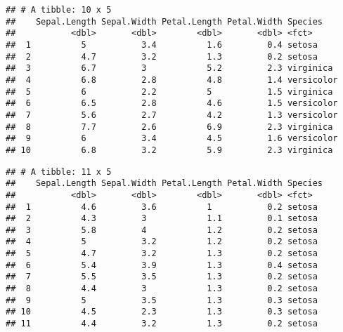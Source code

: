 \documentclass[]{book}
\newenvironment{Shaded}{\begin{snugshade}}{\end{snugshade}}
\newcommand{\DataTypeTok}[1]{\textcolor[rgb]{0.13,0.29,0.53}{#1}}
\newcommand{\DecValTok}[1]{\textcolor[rgb]{0.00,0.00,0.81}{#1}}
\newcommand{\KeywordTok}[1]{\textcolor[rgb]{0.13,0.29,0.53}{\textbf{#1}}}
\newcommand{\NormalTok}[1]{#1}
\newcommand{\OperatorTok}[1]{\textcolor[rgb]{0.81,0.36,0.00}{\textbf{#1}}}
\newcommand{\StringTok}[1]{\textcolor[rgb]{0.31,0.60,0.02}{#1}}
\begin{document}
\begin{Shaded}
\end{Shaded}

\begin{verbatim}
## # A tibble: 10 x 5
##    Sepal.Length Sepal.Width Petal.Length Petal.Width Species   
##           <dbl>       <dbl>        <dbl>       <dbl> <fct>     
##  1          5           3.4          1.6         0.4 setosa    
##  2          4.7         3.2          1.3         0.2 setosa    
##  3          6.7         3            5.2         2.3 virginica 
##  4          6.8         2.8          4.8         1.4 versicolor
##  5          6           2.2          5           1.5 virginica 
##  6          6.5         2.8          4.6         1.5 versicolor
##  7          5.6         2.7          4.2         1.3 versicolor
##  8          7.7         2.6          6.9         2.3 virginica 
##  9          6           3.4          4.5         1.6 versicolor
## 10          6.8         3.2          5.9         2.3 virginica
\end{verbatim}

\begin{Shaded}
\end{Shaded}

\begin{verbatim}
## # A tibble: 11 x 5
##    Sepal.Length Sepal.Width Petal.Length Petal.Width Species
##           <dbl>       <dbl>        <dbl>       <dbl> <fct>  
##  1          4.6         3.6          1           0.2 setosa 
##  2          4.3         3            1.1         0.1 setosa 
##  3          5.8         4            1.2         0.2 setosa 
##  4          5           3.2          1.2         0.2 setosa 
##  5          4.7         3.2          1.3         0.2 setosa 
##  6          5.4         3.9          1.3         0.4 setosa 
##  7          5.5         3.5          1.3         0.2 setosa 
##  8          4.4         3            1.3         0.2 setosa 
##  9          5           3.5          1.3         0.3 setosa 
## 10          4.5         2.3          1.3         0.3 setosa 
## 11          4.4         3.2          1.3         0.2 setosa
\end{verbatim}
\end{document}
